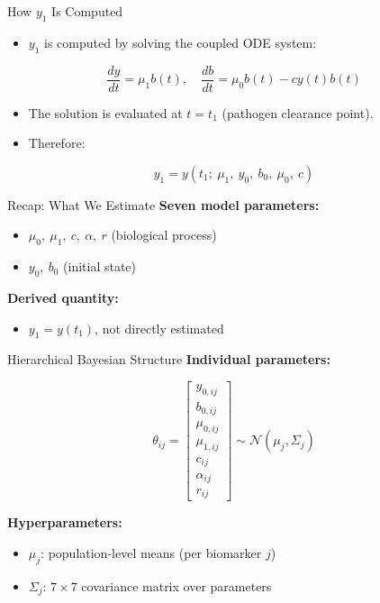 \documentclass[
  ignorenonframetext,
]{beamer}
\providecommand{\tightlist}{%
  \setlength{\itemsep}{0pt}\setlength{\parskip}{0pt}}\usepackage{longtable,booktabs,array}
\begin{document}
\begin{frame}{How \(y_1\) Is Computed}
\label{how-y_1-is-computed}
\begin{itemize}
\tightlist
\item
  \(y_1\) is computed by solving the coupled ODE system:
\end{itemize}

\[
\frac{dy}{dt} = \mu_1 b(t), \quad \frac{db}{dt} = \mu_0 b(t) - c y(t) b(t)
\]

\begin{itemize}
\tightlist
\item
  The solution is evaluated at \(t = t_1\) (pathogen clearance point).
\item
  Therefore:
\end{itemize}

\[
y_1 = y(t_1;\ \mu_1,\ y_0,\ b_0,\ \mu_0,\ c)
\]
\end{frame}

\begin{frame}{Recap: What We Estimate}
\label{recap-what-we-estimate}
\textbf{Seven model parameters:}

\begin{itemize}
\tightlist
\item
  \(\mu_0,\ \mu_1,\ c,\ \alpha,\ r\) (biological process)
\item
  \(y_0,\ b_0\) (initial state)
\end{itemize}

\textbf{Derived quantity:}

\begin{itemize}
\tightlist
\item
  \(y_1 = y(t_1)\), not directly estimated
\end{itemize}
\end{frame}

\begin{frame}{Hierarchical Bayesian Structure}
\label{hierarchical-bayesian-structure}
\textbf{Individual parameters:}

\[
\theta_{ij} = \begin{bmatrix}
y_{0,ij} \\
b_{0,ij} \\
\mu_{0,ij} \\
\mu_{1,ij} \\
c_{ij} \\
\alpha_{ij} \\
r_{ij}
\end{bmatrix} 
\sim \mathcal{N}(\mu_j, \Sigma_j)
\]

\textbf{Hyperparameters:}

\begin{itemize}
\tightlist
\item
  \(\mu_j\): population-level means (per biomarker \(j\))
\item
  \(\Sigma_j\): \(7 \times 7\) covariance matrix over parameters
\end{itemize}
\end{frame}
\end{document}
